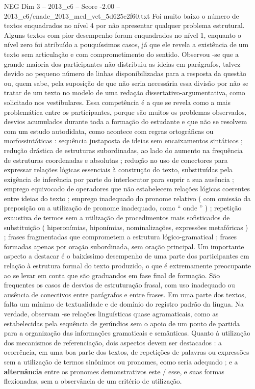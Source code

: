 \begin{textsample}{NEG Dim 3 – 2013\_c6 – Score -2.00 – 2013\_c6/enade\_2013\_med\_vet\_5d625e2f60.txt}
Foi muito baixo o número de textos enquadrados no nível 4 por não apresentar qualquer problema estrutural.
Alguns textos com pior desempenho foram enquadrados no nível 1, enquanto o nível zero foi atribuído a pouquíssimos casos, já que ele revela a existência de um texto sem articulação e com comprometimento do sentido.
Observou -se que a grande maioria dos participantes não distribuiu as ideias em parágrafos, talvez devido ao pequeno número de linhas disponibilizadas para a resposta da questão ou, quem sabe, pela suposição de que não seria necessária essa divisão por não se tratar de um texto no modelo de uma redação dissertativo-argumentativa, como solicitado nos vestibulares.
Essa competência é a que se revela como a mais problemática entre os participantes, porque são muitos os problemas observados, desvios acumulados durante toda a formação do estudante e que não se resolvem com um estudo autodidata, como acontece com regras ortográficas ou morfossintáticas : sequência justaposta de ideias sem encaixamentos sintáticos ; redução drástica de estruturas subordinadas, ao lado do aumento na frequência de estruturas coordenadas e absolutas ; redução no uso de conectores para expressar relações lógicas essenciais à construção do texto, substituídas pela exigência de inferência por parte do interlocutor para suprir a sua ausência ; emprego equivocado de operadores que não estabelecem relações lógicas coerentes entre ideias do texto ; emprego inadequado do pronome relativo ( com omissão da preposição ou a utilização de pronome inadequado, como “ onde ” ) ; repetição exaustiva de termos sem a utilização de procedimentos mais sofisticados de substituição ( hiperonímias, hiponímias, nominalizações, expressões metafóricas ) ; frases fragmentadas que comprometem a estrutura lógico-gramatical ; frases formadas apenas por oração subordinada, sem oração principal.
Um importante aspecto a destacar é o baixíssimo desempenho de uma parte dos participantes em relação à estrutura formal do texto produzido, o que é extremamente preocupante ao se levar em conta que são graduandos em fase final de formação.
São frequentes os casos de desvios de estruturação frasal, com uso inadequado ou ausência de conectivos entre parágrafos e entre frases.
Em uma parte dos textos, falta um mínimo de textualidade e de domínio do registro padrão da língua.
Na verdade, observam -se relações linguísticas quase agramaticais, como as estabelecidas pela sequência de gerúndios sem o apoio de um ponto de partida para a organização das informações gramaticais e semânticas.
Quanto à utilização dos mecanismos de referenciação, dois aspectos devem ser destacados : a ocorrência, em uma boa parte dos textos, de repetições de palavras ou expressões sem a utilização de termos sinônimos ou pronomes, como seria adequado ; e a \textbf{alternância} entre os pronomes demonstrativos este / esse, e suas formas flexionadas, sem a observância de um critério de utilização.

\end{textsample}
